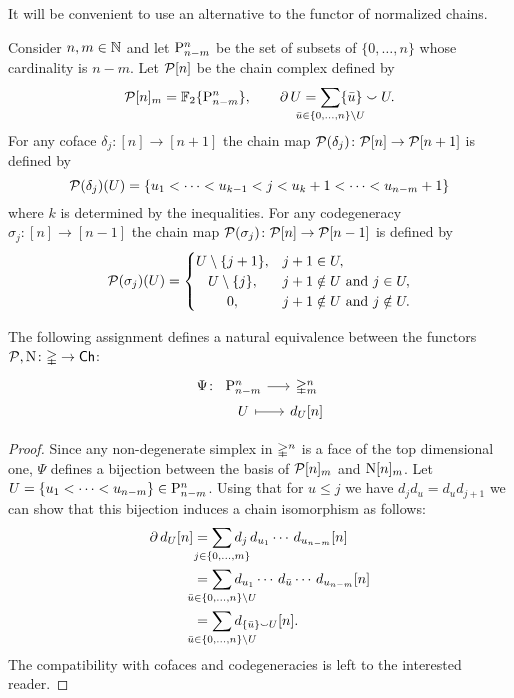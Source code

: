 It will be convenient to use an alternative to the functor of normalized chains.

Consider $n,m \in \N$ and let $\P_{n-m}^n$ be the set of subsets of $\{0, \dots, n\}$ whose cardinality is $n-m$.
Let $\cP[n]$ be the chain complex defined by
\[
\cP[n]_m = \Ftwo\set{\P_{n-m}^n}, \qquad
\bd U = \sum_{\mathclap{\bar u \in \{0, \dots, n\} \setminus U}} \{\bar u\} \union U.
\]
For any coface $\delta_j \colon [n] \to [n+1]$ the chain map $\cP(\delta_j) \colon \cP[n] \to \cP[n+1]$ is defined by
\[
\cP(\delta_j)(U) = \{ u_1 < \dots < u_{k-1} < j < u_k+1 < \dots < u_{n-m}+1 \}
\]
where $k$ is determined by the inequalities.
For any codegeneracy $\sigma_j \colon [n] \to [n-1]$ the chain map $\cP(\sigma_j) \colon \cP[n] \to \cP[n-1]$ is defined by
\[
\cP(\sigma_j)(U) = \begin{cases}
	U \setminus \{j+1\}, & j+1 \in U, \\
	\hfil U \setminus \{j\}, & j+1 \notin U \text{ and } j \in U, \\
	\hfil 0, & j+1 \notin U \text{ and } j \notin U.
\end{cases}
\]

\begin{lemma}
	The following assignment defines a natural equivalence between the functors $\cP,\chains \colon \simplex \to \Ch$:
	\[
	\begin{tikzcd}[column sep=small,row sep=0]
		\Psi \colon &[-15] \P_{n-m}^n \rar & \simplex^n_m \\
		& U \rar[mapsto] & d_U [n]
	\end{tikzcd}
	\]
\end{lemma}

\begin{proof}
	Since any non-degenerate simplex in $\simplex^n$ is a face of the top dimensional one, $\Psi$ defines a bijection between the basis of $\cP[n]_m$ and $\chains[n]_m$.
	Let $U = \{u_1 < \cdots < u_{n-m}\} \in \rP_{n-m}^n$.
	Using that for $u \leq j$ we have $d_jd_u = d_ud_{j+1}$ we can show that this bijection induces a chain isomorphism as follows:
	\begin{align*}
		\bd d_U[n] &=
		\sum_{\mathclap{j \in \{0, \dots, m\}}}
		d_j\, d_{u_1} \cdots\, d_{u_{n-m}}[n] \\ &=
		\sum_{\mathclap{\bar u \in \{0, \dots, n\} \setminus U}}
		d_{u_1} \cdots\, d_{\bar{u}} \cdots\, d_{u_{n-m}}[n] \\ &=
		\sum_{\mathclap{\bar u \in \{0, \dots, n\} \setminus U}}
		d_{\{\bar u\} \union U}[n].
	\end{align*}
	The compatibility with cofaces and codegeneracies is left to the interested reader.
\end{proof}

